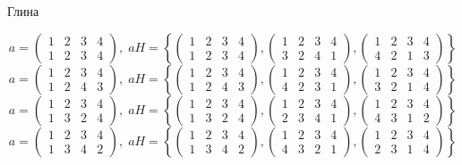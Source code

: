 \documentclass[a4paper,12pt]{article}
\begin{document}
\begin{itemize}
\begin{center}
Глина
\end{center}
\[a = \begin{pmatrix} 1 & 2 & 3 & 4 \\ 1&2&3&4\end{pmatrix}, \; aH = \left\{\begin{pmatrix} 1 & 2 & 3 & 4 \\ 1&2&3&4\end{pmatrix}, \begin{pmatrix} 1 & 2 & 3 & 4 \\ 3&2&4&1\end{pmatrix}, \begin{pmatrix} 1 & 2 & 3 & 4 \\ 4&2&1&3\end{pmatrix} \right\}\]
\[a = \begin{pmatrix} 1 & 2 & 3 & 4 \\ 1&2&4&3\end{pmatrix}, \; aH = \left\{\begin{pmatrix} 1 & 2 & 3 & 4 \\ 1&2&4&3\end{pmatrix}, \begin{pmatrix} 1 & 2 & 3 & 4 \\ 4&2&3&1\end{pmatrix}, \begin{pmatrix} 1 & 2 & 3 & 4 \\ 3&2&1&4\end{pmatrix} \right\}\]
\[a = \begin{pmatrix} 1 & 2 & 3 & 4 \\ 1&3&2&4\end{pmatrix}, \; aH = \left\{\begin{pmatrix} 1 & 2 & 3 & 4 \\ 1&3&2&4\end{pmatrix}, \begin{pmatrix} 1 & 2 & 3 & 4 \\ 2&3&4&1\end{pmatrix}, \begin{pmatrix} 1 & 2 & 3 & 4 \\ 4&3&1&2\end{pmatrix} \right\}\]
\[a = \begin{pmatrix} 1 & 2 & 3 & 4 \\ 1&3&4&2\end{pmatrix}, \; aH = \left\{\begin{pmatrix} 1 & 2 & 3 & 4 \\ 1&3&4&2\end{pmatrix}, \begin{pmatrix} 1 & 2 & 3 & 4 \\ 4&3&2&1\end{pmatrix}, \begin{pmatrix} 1 & 2 & 3 & 4 \\ 2&3&1&4\end{pmatrix} \right\}\]

\end{itemize}
\end{document}
